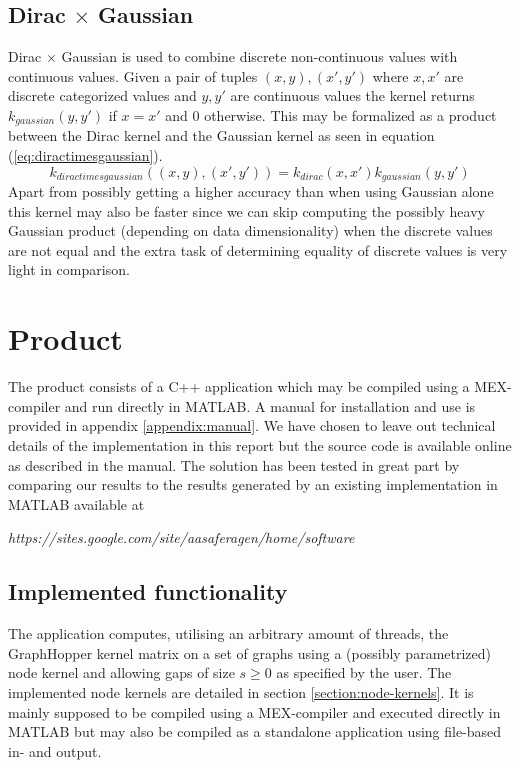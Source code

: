 \documentclass{article}
\begin{document}
\subsection{Dirac $\times$ Gaussian}
Dirac $\times$ Gaussian is used to combine discrete non-continuous values with continuous values. Given a pair of tuples $(x,y),(x',y')$ where $x,x'$ are discrete categorized values and $y,y'$ are continuous values the kernel returns $k_{gaussian}(y,y')$ if $x=x'$ and 0 otherwise. This may be formalized as a product between the Dirac kernel and the Gaussian kernel as seen in equation (\ref{eq:diractimesgaussian}).
\begin{equation}
\label{eq:diractimesgaussian}
k_{diractimesgaussian}((x,y), (x',y')) = k_{dirac}(x, x') k_{gaussian}(y, y')
\end{equation}
Apart from possibly getting a higher accuracy than when using Gaussian alone this kernel may also be faster since we can skip computing the possibly heavy Gaussian product (depending on data dimensionality) when the discrete values are not equal and the extra task of determining equality of discrete values is very light in comparison.

\section{Product}
The product consists of a C++ application which may be compiled using a MEX-compiler and run directly in MATLAB. A manual for installation and use is provided in appendix \ref{appendix:manual}. We have chosen to leave out technical details of the implementation in this report but the source code is available online as described in the manual. The solution has been tested in great part by comparing our results to the results generated by an existing implementation in MATLAB available at

\textit{https://sites.google.com/site/aasaferagen/home/software} 

\subsection{Implemented functionality}
The application computes, utilising an arbitrary amount of threads, the GraphHopper kernel matrix on a set of graphs using a (possibly parametrized) node kernel and allowing gaps of size $s\geq 0$ as specified by the user. The implemented node kernels are detailed in section \ref{section:node-kernels}. It is mainly supposed to be compiled using a MEX-compiler and executed directly in MATLAB but may also be compiled as a standalone application using file-based in- and output.
\end{document}
